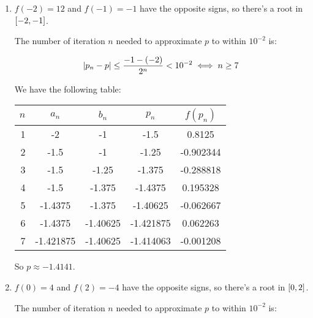 \documentclass[../../Assignments.tex]{subfiles}
\begin{document}
\begin{solution}
    \begin{enumerate}[label = (\alph*)]
        \item \(f(-2) = 12\) and \(f(-1) = -1\) have the opposite signs, so
            there's a root in \(\interval{-2}{-1}\).

            The number of iteration \(n\) needed to approximate \(p\) to within
            \(10^{-2}\) is:

            \[\abs{p_n - p} \leq \frac{-1 - (-2)}{2^n} < 10^{-2} \iff n \geq 7\]

            We have the following table:

            \begin{table}[H]
                \centering
                \begin{tabular}{r S[table-format=-1.6] S[table-format=-1.5] S[table-format=-1.6] S[table-format=-1.6]}
                    \toprule
                    \(n\)  &  {\(a_n\)}  &  {\(b_n\)}  &  {\(p_n\)}  &  {\(f(p_n)\)}  \\
                      &  -2         &  -1         &  -1.5       &   0.8125       \\
                        2  &  -1.5       &  -1         &  -1.25      &  -0.902344     \\
                        3  &  -1.5       &  -1.25      &  -1.375     &  -0.288818     \\
                        4  &  -1.5       &  -1.375     &  -1.4375    &   0.195328     \\
                        5  &  -1.4375    &  -1.375     &  -1.40625   &  -0.062667     \\
                        6  &  -1.4375    &  -1.40625   &  -1.421875  &   0.062263     \\
                        7  &  -1.421875  &  -1.40625   &  -1.414063  &  -0.001208     \\
                    \bottomrule
                \end{tabular}
            \end{table}

            So \(p \approx \num{-1.4141}\).

        \item \(f(0) = 4\) and \(f(2) = -4\) have the opposite signs, so there's
            a root in \(\interval{0}{2}\).

            The number of iteration \(n\) needed to approximate \(p\) to within
            \(10^{-2}\) is:


\end{enumerate}
\end{solution}
\end{document}
